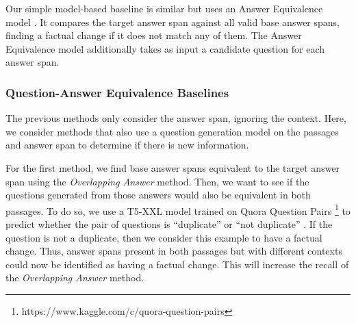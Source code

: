 Our simple model-based baseline is similar but uses an Answer Equivalence model \citep{bulian2022tomayto}. It compares the target answer span against all valid base answer spans, finding a factual change if it does not match any of them. The Answer Equivalence model additionally takes as input a candidate question for each answer span. 


\subsubsection*{Question-Answer Equivalence Baselines}
\label{Method:Query Similarity}
The previous methods only consider the answer span, ignoring the context. Here, we consider methods that also use a question generation model on the passages and answer span to determine if there is new information.

For the first method, we find base answer spans equivalent to the target answer span using the \textit{Overlapping Answer} method. Then, we want to see if the questions generated from those answers would also be equivalent in both passages. To do so, 
we use a T5-XXL \citep{raffel2020exploring} model trained on Quora Question Pairs \footnote{https://www.kaggle.com/c/quora-question-pairs} to predict whether the pair of questions is ``duplicate'' or ``not duplicate'' . If the question is not a duplicate, then we consider this example to have a factual change. Thus, answer spans present in both passages but with different contexts could now be identified as having a factual change. This will increase the recall of the \textit{Overlapping Answer} method.


